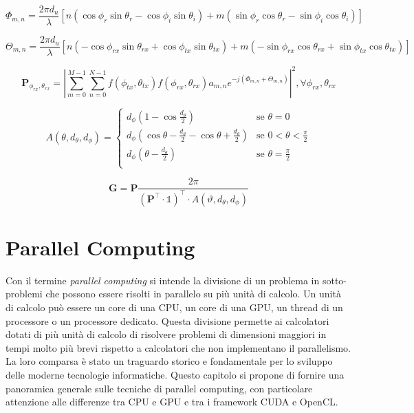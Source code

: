 \begin{equation}
  \label{eq:phase-phi}\Phi_{m,n}= \frac{2\pi d_{u}}{\lambda}[n(\cos{\phi_{r}\sin{\theta_{r}}}
  -\cos{\phi_{i}}\sin{\theta_{i}})+m(\sin{\phi_{r}}\cos{\theta_{r}}-\sin{\phi_{i}}
  \cos{\theta_{i}})]
\end{equation}

\begin{equation}
  \label{eq:phase-theta}\Theta_{m,n}= \frac{2\pi d_{u}}{\lambda}[n(-\cos{\phi_{rx}\sin{\theta_{rx}}}
  +\cos{\phi_{tx}}\sin{\theta_{tx}})+m(-\sin{\phi_{rx}}\cos{\theta_{rx}}+\sin{\phi_{tx}}
  \cos{\theta_{tx}})]
\end{equation}

\begin{equation}
  \label{eq:power}\textbf{P}_{\phi_{rx},\theta_{rx}}= \left|\sum_{m=0}^{M-1}{\sum_{n=0}^{N-1}{f(\phi_{tx}, \theta_{tx})f(\phi_{rx},\theta_{rx})a_{m,n}e^{-j(\Phi_{m,n}+\Theta_{m,n})}}}
  \right|^{2}, \forall \phi_{rx}, \theta_{rx}
\end{equation}

\begin{equation}
  \label{eq:area-spherical-element}A(\theta, d_{\theta}, d_{\phi})=
  \begin{cases}
    d_{\phi}(1-\cos{\frac{d_{\theta}}{2}})                                         & \text{se }\theta = 0                 \\
    d_{\phi}(\cos{\theta-\frac{d_{\theta}}{2}}- \cos{\theta+\frac{d_{\theta}}{2}}) & \text{se }0 < \theta < \frac{\pi}{2} \\
    d_{\phi}(\theta-\frac{d_{\theta}}{2})                                          & \text{se }\theta = \frac{\pi}{2}     \\
  \end{cases}
\end{equation}

\begin{equation}
  \label{eq:gain}\textbf{G}=\textbf{P}\frac{2\pi}{(\textbf{P}^{\top}\cdot
  \mathds{1})^{\top}\cdot A(\vartheta, d_{\theta}, d_{\phi})}
\end{equation}

\section{Parallel Computing}
\label{sec:parallelcomputing}

Con il termine \textit{parallel computing} si intende la divisione di un
problema in sotto-problemi che possono essere risolti in parallelo su più unità
di calcolo. Un unità di calcolo può essere un core di una CPU, un core di una
GPU, un thread di un processore o un processore dedicato. Questa divisione
permette ai calcolatori dotati di più unità di calcolo di risolvere problemi di
dimensioni maggiori in tempi molto più brevi rispetto a calcolatori che non
implementano il parallelismo. La loro comparsa è stato un traguardo storico e fondamentale
per lo sviluppo delle moderne tecnologie informatiche. Questo capitolo si
propone di fornire una panoramica generale sulle tecniche di parallel computing,
con particolare attenzione alle differenze tra CPU e GPU e tra i framework CUDA e
OpenCL.

